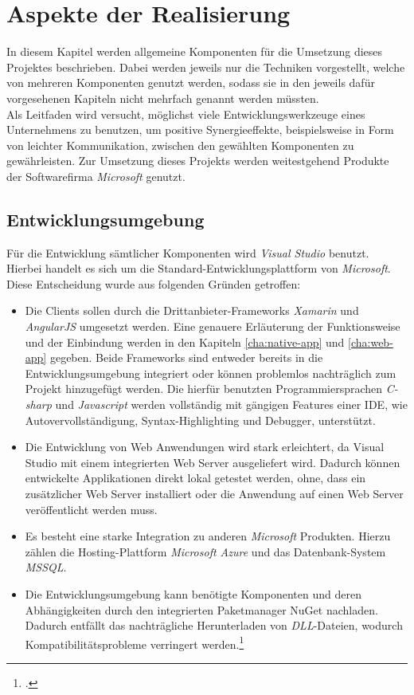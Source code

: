 \chapter{Aspekte der Realisierung}
\label{cha:realisierung}
In diesem Kapitel werden allgemeine Komponenten für die Umsetzung dieses Projektes beschrieben. Dabei werden jeweils nur die Techniken vorgestellt, welche von mehreren Komponenten genutzt werden, sodass sie in den jeweils dafür vorgesehenen Kapiteln nicht mehrfach genannt werden müssten. \\
Als Leitfaden wird versucht, möglichst viele Entwicklungswerkzeuge eines Unternehmens zu benutzen, um positive Synergieeffekte, beispielsweise in Form von leichter Kommunikation, zwischen den gewählten Komponenten zu gewährleisten. Zur Umsetzung dieses Projekts werden weitestgehend Produkte der Softwarefirma \textit{Microsoft} genutzt.

\section{Entwicklungsumgebung}
\label{sec:entwicklungsumgebung}
Für die Entwicklung sämtlicher Komponenten wird \textit{\ac{Visual Studio}} benutzt. Hierbei handelt es sich um die Standard-\linebreak Entwicklungsplattform von \textit{Microsoft}. Diese Entscheidung wurde aus folgenden Gründen getroffen:
\begin{itemize}
\item Die Clients sollen durch die Drittanbieter-Frameworks \textit{Xamarin} und \textit{AngularJS} umgesetzt werden. Eine genauere Erläuterung der Funktionsweise und der Einbindung werden in den Kapiteln \ref{cha:native-app} und \ref{cha:web-app} gegeben. Beide Frameworks sind entweder bereits in die Entwicklungsumgebung integriert oder können problemlos nachträglich zum Projekt hinzugefügt werden. Die hierfür benutzten Programmiersprachen \textit{\gls{C-sharp}} und \textit{\gls{Javascript}} werden vollständig mit gängigen Features einer \ac{IDE}, wie Autovervollständigung, Syntax-Highlighting und Debugger, unterstützt. 
\item Die Entwicklung von Web Anwendungen wird stark erleichtert, da \ac{Visual Studio} mit einem integrierten Web Server ausgeliefert wird. Dadurch können entwickelte Applikationen direkt lokal getestet werden, ohne, dass ein zusätzlicher Web Server installiert oder die Anwendung auf einen Web Server veröffentlicht werden muss.
\item Es besteht eine starke Integration zu anderen \textit{Microsoft} Produkten. Hierzu zählen die Hosting-Plattform \textit{Microsoft Azure} und das Datenbank-System \textit{\ac{MSSQL}}.
\item Die Entwicklungsumgebung kann benötigte Komponenten und deren Abhängigkeiten durch den integrierten Paketmanager \gls{NuGet} nachladen. Dadurch entfällt das nachträgliche Herunterladen von \textit{\ac{DLL}}-Dateien, wodurch Kompatibilitätsprobleme verringert werden.\footcite{online:VisualStudio}
\end{itemize}
